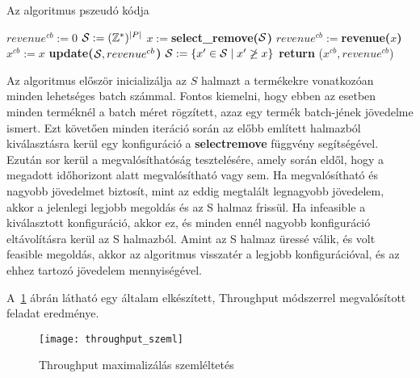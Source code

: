 \begin{algorithm}[H]
\caption{Az algoritmus pszeudó kódja}
\label{throughput}
\begin{algorithmic}[1]
  \State $revenue^{cb}:=  0$
  \State ${\cal S}:=  (\mathbb{Z}^*)^{|P|}$
    \State $x:= $\textbf{select\_remove(}$\cal S$\textbf{)}
        \State $revenue^{cb}:= $\textbf{revenue(}$x$\textbf{)}
        \State $x^{cb}:=  x$
        \State \textbf{update(}${\cal S},revenue^{cb}$\textbf{)}
      \EndIf
    \Else
      \State ${\cal S}:= \{ x'\in{\cal S} \mid x' \not\ge x\}$
    \EndIf
  \EndWhile
    \State \textbf{return} ($x^{cb},revenue^{cb}$)
  \EndIf
\end{algorithmic}
\end{algorithm}

Az algoritmus először inicializálja az $S$ halmazt a termékekre vonatkozóan minden lehetséges batch számmal.
Fontos kiemelni, hogy ebben az esetben minden terméknél a batch méret rögzített, azaz egy termék batch-jének jövedelme ismert.
Ezt követően minden iteráció során az előbb említett halmazból kiválasztásra kerül egy konfiguráció a \textbf{select\textunderscore remove} függvény segítségével.
Ezután sor kerül a megvalósíthatóság tesztelésére, amely során eldől, hogy a megadott időhorizont alatt megvalósítható vagy sem.
Ha megvalósítható és nagyobb jövedelmet biztosít, mint az eddig megtalált legnagyobb jövedelem, akkor a jelenlegi legjobb megoldás és az S halmaz frissül.
Ha infeasible a kiválasztott konfiguráció, akkor ez, és minden ennél nagyobb konfiguráció eltávolításra kerül az S halmazból.
Amint az S halmaz üressé válik, és volt feasible megoldás, akkor az algoritmus visszatér a legjobb konfigurációval, és az ehhez tartozó jövedelem mennyiségével.

A~\ref{throughput1} ábrán látható egy általam elkészített, Throughput módszerrel megvalósított feladat eredménye.
\begin{figure}[H]
\begin{center}
\texttt{[image: throughput\_szeml]}
\caption{Throughput maximalizálás szemléltetés}
\label{throughput1}
\end{center}
\end{figure}

